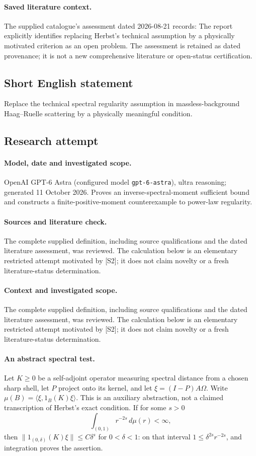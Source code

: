 \documentclass[11pt]{article}
\begin{document}
\paragraph{Saved literature context.} The supplied catalogue's assessment dated 2026-08-21 records: The report explicitly identifies replacing Herbst's technical assumption by a physically motivated criterion as an open problem. The assessment is retained as dated provenance; it is not a new comprehensive literature or open-status certification.
\subsection{Short English statement}
Replace the technical spectral regularity assumption in massless-background Haag--Ruelle scattering by a physically meaningful condition.
\subsection{Research attempt}
\paragraph{Model, date and investigated scope.}
OpenAI GPT-6 Astra (configured model \texttt{gpt-6-astra}), ultra reasoning; generated 11 October 2026. Proves an inverse-spectral-moment sufficient bound and constructs a finite-positive-moment counterexample to power-law regularity.

\paragraph{Sources and literature check.}
The complete supplied definition, including source qualifications and the dated literature assessment, was reviewed. The calculation below is an elementary restricted attempt motivated by [S2]; it does not claim novelty or a fresh literature-status determination.

\paragraph{Context and investigated scope.} The complete supplied definition, including source qualifications and the dated literature assessment, was reviewed. The calculation below is an elementary restricted attempt motivated by [S2]; it does not claim novelty or a fresh literature-status determination.

\paragraph{An abstract spectral test.} Let $K\geq0$ be a self-adjoint operator measuring spectral distance from a chosen sharp shell, let $P$ project onto its kernel, and let $\xi=(I-P)A\Omega$. Write $\mu(B)=\langle\xi,1_B(K)\xi\rangle$. This is an auxiliary abstraction, not a claimed transcription of Herbst's exact condition. If for some $s>0$
\[
 \int_{(0,1)}r^{-2s}\,d\mu(r)<\infty,
\]
then $\|1_{(0,\delta)}(K)\xi\|\leq C\delta^s$ for $0<\delta<1$: on that interval $1\leq\delta^{2s}r^{-2s}$, and integration proves the assertion.
\end{document}
